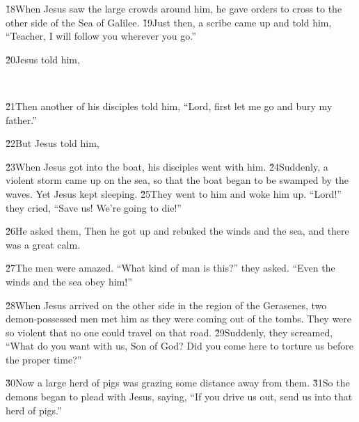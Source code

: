 \v{18}When Jesus saw the large crowds around him, he gave orders to cross to the other side of the Sea of Galilee. \v{19}Just then, a scribe came up and told him, ``Teacher, I will follow you wherever you go.''

\v{20}Jesus told him,

\begin{poetry}
\poeml {} \\
\poemll    {}
\end{poetry}

\v{21}Then another of his disciples told him, ``Lord, first let me go and bury my father.''

\v{22}But Jesus told him, 

\v{23}When Jesus got into the boat, his disciples went with him. \v{24}Suddenly, a violent storm came up on the sea, so that the boat began to be swamped by the waves. Yet Jesus kept sleeping. \v{25}They went to him and woke him up. ``Lord!'' they cried, ``Save us! We're going to die!''

\v{26}He asked them,  Then he got up and rebuked the winds and the sea, and there was a great calm.

\v{27}The men were amazed. ``What kind of man is this?'' they asked. ``Even the winds and the sea obey him!''

\v{28}When Jesus arrived on the other side in the region of the Gerasenes, two demon-possessed men met him as they were coming out of the tombs. They were so violent that no one could travel on that road. \v{29}Suddenly, they screamed, ``What do you want with us, Son of God? Did you come here to torture us before the proper time?''

\v{30}Now a large herd of pigs was grazing some distance away from them. \v{31}So the demons began to plead with Jesus, saying, ``If you drive us out, send us into that herd of pigs.''

